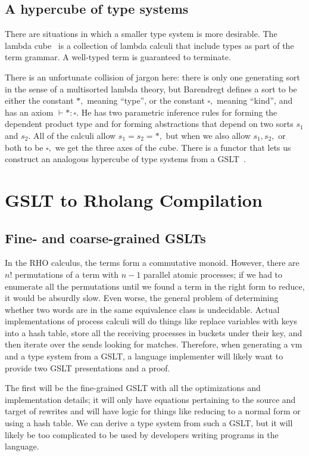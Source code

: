 \documentclass{article}
\begin{document}
\subsection{A hypercube of type systems}

There are situations in which a smaller type system is more desirable. The lambda cube~\cite{Barendregt1991} is a collection of lambda calculi that include types as part of the term grammar.  A well-typed term is guaranteed to terminate.  

There is an unfortunate collision of jargon here: there is only one generating sort in the sense of a multisorted lambda theory, but Barendregt defines a sort to be either the constant $*,$ meaning ``type'', or the constant $\square,$ meaning ``kind'', and has an axiom $\vdash *\colon \square.$  He has two parametric inference rules for forming the dependent product type and for forming abstractions that depend on two sorts $s_1$ and $s_2.$  All of the calculi allow $s_1 = s_2 = *,$ but when we also allow $s_1, s_2,$ or both to be $\square,$ we get the three axes of the cube.  There is a functor that lets us construct an analogous hypercube of type systems from a GSLT~\cite{HypercubePaper}.

\section{GSLT to Rholang Compilation}

\subsection{Fine- and coarse-grained GSLTs}
In the RHO calculus, the terms form a commutative monoid.  However, there are $n!$ permutations of a term with $n-1$ parallel atomic processes; if we had to enumerate all the permutations until we found a term in the right form to reduce, it would be absurdly slow.  Even worse, the general problem of determining whether two words are in the same equivalence class is undecidable.  Actual implementations of process calculi will do things like replace variables with keys into a hash table, store all the receiving processes in buckets under their key, and then iterate over the sends looking for matches.  Therefore, when generating a vm and a type system from a GSLT, a language implementer will likely want to provide two GSLT presentations and a proof.

The first will be the fine-grained GSLT with all the optimizations and implementation details; it will only have equations pertaining to the source and target of rewrites and will have logic for things like reducing to a normal form or using a hash table.  We can derive a type system from such a GSLT, but it will likely be too complicated to be used by developers writing programs in the language.
\end{document}
